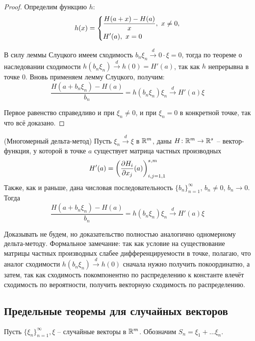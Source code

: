 \begin{proof}
    Определим функцию $h$:
    \[
        h(x) = \left\{\begin{aligned}
            & \frac{H(a+x)-H(a)}{x},\ x \neq 0,
            \\
            & H'(a),\ x = 0
        \end{aligned}\right.
    \]
    
    В силу леммы Слуцкого имеем сходимость $b_n \xi_n \xrightarrow{d} 0 \cdot \xi = 0$, тогда по теореме о наследовании сходимости $h(b_n \xi_n) \xrightarrow{d} h(0) = H'(a)$, так как $h$ непрерывна в точке $0$. Вновь применяем лемму Слуцкого, получим:
    \[
        \frac{H(a+b_n\xi_n) - H(a)}{b_n} = h(b_n \xi_n) \xi_n \xrightarrow{d} H'(a) \xi
    \]

    Первое равенство справедливо и при $\xi_n \neq 0$, и при $\xi_n = 0$ в конкретной точке, так что всё доказано.
\end{proof}

\begin{proposition} (Многомерный дельта-метод)
    Пусть $\xi_n \xrightarrow{d} \xi$ в $\mathbb{R}^m$, даны $H \colon \mathbb{R}^m \to \mathbb{R}^s$ -- вектор-функция, у которой в точке $a$ существует матрица частных производных
    \[
        H'(a) = \left(\frac{\partial H_i}{\partial x_j}(a)\right)_{i, j = 1, 1}^{s, m}
    \]
    Также, как и раньше, дана числовая последовательность $\{b_n\}_{n=1}^\infty$, $b_n \neq 0$, $b_n \to 0$. Тогда
    \[
        \frac{H(a+b_n\xi_n) - H(a)}{b_n} = h(b_n \xi_n) \xi_n \xrightarrow{d} H'(a) \xi
    \]
\end{proposition}

\begin{note}
    Доказывать не будем, но доказательство полностью аналогично одномерному дельта-методу. Формальное замечание: так как условие на существование матрицы частных производных слабее дифференцируемости в точке, полагаю, что аналог сходимости $h(b_n \xi_n) \xrightarrow{d} h(0)$ сначала нужно получить покоординатно, а затем, так как сходимость покомпонентно по распределению к константе влечёт сходимость по вероятности, получить векторную сходимость по распределению.
\end{note}

\subsection{Предельные теоремы для случайных векторов}

Пусть $\{\xi_n\}_{n=1}^\infty, \xi$ -- случайные векторы в $\mathbb{R}^m$. Обозначим $S_n = \xi_1 + \dots \xi_n$.

